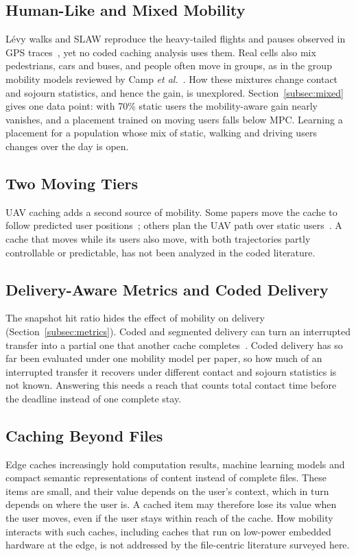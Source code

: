 \subsection{Human-Like and Mixed Mobility}
L\'evy walks and SLAW reproduce the heavy-tailed flights and pauses observed in GPS traces~\cite{rhee2011levy,lee2009slaw}, yet no coded caching analysis uses them. Real cells also mix pedestrians, cars and buses, and people often move in groups, as in the group mobility models reviewed by Camp \emph{et al.}~\cite{camp2002survey}. How these mixtures change contact and sojourn statistics, and hence the gain, is unexplored. Section~\ref{subsec:mixed} gives one data point: with 70\% static users the mobility-aware gain nearly vanishes, and a placement trained on moving users falls below MPC. Learning a placement for a population whose mix of static, walking and driving users changes over the day is open.

\subsection{Two Moving Tiers}
UAV caching adds a second source of mobility. Some papers move the cache to follow predicted user positions~\cite{chen2017sky}; others plan the UAV path over static users~\cite{xu2018overcoming}. A cache that moves while its users also move, with both trajectories partly controllable or predictable, has not been analyzed in the coded literature.

\subsection{Delivery-Aware Metrics and Coded Delivery}
The snapshot hit ratio hides the effect of mobility on delivery (Section~\ref{subsec:metrics}). Coded and segmented delivery can turn an interrupted transfer into a partial one that another cache completes~\cite{poularakis2013exploiting,ozfatura2020mobility}. Coded delivery has so far been evaluated under one mobility model per paper, so how much of an interrupted transfer it recovers under different contact and sojourn statistics is not known. Answering this needs a reach that counts total contact time before the deadline instead of one complete stay.

\subsection{Caching Beyond Files}
Edge caches increasingly hold computation results, machine learning models and compact semantic representations of content instead of complete files. These items are small, and their value depends on the user's context, which in turn depends on where the user is. A cached item may therefore lose its value when the user moves, even if the user stays within reach of the cache. How mobility interacts with such caches, including caches that run on low-power embedded hardware at the edge, is not addressed by the file-centric literature surveyed here.

